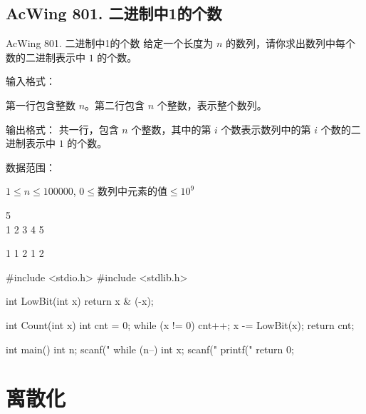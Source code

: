 \subsection{AcWing 801. 二进制中1的个数}
\begin{titledbox}{AcWing 801. 二进制中1的个数}
给定一个长度为 $n$ 的数列，请你求出数列中每个数的二进制表示中 $1$ 的个数。

输入格式：

第一行包含整数 $n$。第二行包含 $n$ 个整数，表示整个数列。

输出格式：
共一行，包含 $n$ 个整数，其中的第 $i$ 个数表示数列中的第 $i$ 个数的二进制表示中 $1$ 的个数。

数据范围：

$1 \le n \le 100000$, $0 \le \text{数列中元素的值} \le 10^9$

\begin{inputblock}
    5 \\
    1 2 3 4 5
\end{inputblock}
\begin{outputblock}
    1 1 2 1 2
\end{outputblock}
\end{titledbox}

\begin{mycpptwocol}[LowBit 运算]
#include <stdio.h>
#include <stdlib.h>

int LowBit(int x)
{
    return x & (-x);
}

int Count(int x)
{
    int cnt = 0;
    while (x != 0) {
        cnt++;
        x -= LowBit(x);
    }
    return cnt;
}

int main()
{
    int n;
    scanf("%
    while (n--) {
        int x;
        scanf("%
        printf("%
    }
    return 0;
}
\end{mycpptwocol}

\section{离散化}
